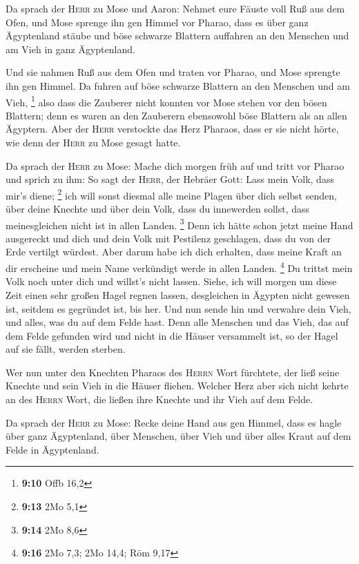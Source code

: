  Da sprach der \textsc{Herr} zu Mose und Aaron: Nehmet
eure Fäuste voll Ruß aus dem Ofen, und Mose sprenge ihn gen Himmel vor
Pharao,  dass es über ganz Ägyptenland stäube und böse
schwarze Blattern auffahren an den Menschen und am Vieh in ganz
Ägyptenland.

 Und sie nahmen Ruß aus dem Ofen und traten vor Pharao,
und Mose sprengte ihn gen Himmel. Da fuhren auf böse schwarze Blattern
an den Menschen und am Vieh, \footnote{\textbf{9:10} Offb 16,2}
 also dass die Zauberer nicht konnten vor Mose stehen vor
den bösen Blattern; denn es waren an den Zauberern ebensowohl böse
Blattern als an allen Ägyptern.  Aber der \textsc{Herr}
verstockte das Herz Pharaos, dass er sie nicht hörte, wie denn der
\textsc{Herr} zu Mose gesagt hatte.

 Da sprach der \textsc{Herr} zu Mose: Mache dich morgen
früh auf und tritt vor Pharao und sprich zu ihm: So sagt der
\textsc{Herr}, der Hebräer Gott: Lass mein Volk, dass mir's diene;
\footnote{\textbf{9:13} 2Mo 5,1}  ich will sonst diesmal
alle meine Plagen über dich selbst senden, über deine Knechte und über
dein Volk, dass du innewerden sollst, dass meinesgleichen nicht ist in
allen Landen. \footnote{\textbf{9:14} 2Mo 8,6}  Denn ich
hätte schon jetzt meine Hand ausgereckt und dich und dein Volk mit
Pestilenz geschlagen, dass du von der Erde vertilgt würdest.
 Aber darum habe ich dich erhalten, dass meine Kraft an
dir erscheine und mein Name verkündigt werde in allen Landen.
\footnote{\textbf{9:16} 2Mo 7,3; 2Mo 14,4; Röm 9,17}  Du
trittst mein Volk noch unter dich und willst's nicht lassen.
 Siehe, ich will morgen um diese Zeit einen sehr großen
Hagel regnen lassen, desgleichen in Ägypten nicht gewesen ist, seitdem
es gegründet ist, bis her.  Und nun sende hin und
verwahre dein Vieh, und alles, was du auf dem Felde hast. Denn alle
Menschen und das Vieh, das auf dem Felde gefunden wird und nicht in die
Häuser versammelt ist, so der Hagel auf sie fällt, werden sterben.

 Wer nun unter den Knechten Pharaos des \textsc{Herrn}
Wort fürchtete, der ließ seine Knechte und sein Vieh in die Häuser
fliehen.  Welcher Herz aber sich nicht kehrte an des
\textsc{Herrn} Wort, die ließen ihre Knechte und ihr Vieh auf dem Felde.

 Da sprach der \textsc{Herr} zu Mose: Recke deine Hand
aus gen Himmel, dass es hagle über ganz Ägyptenland, über Menschen, über
Vieh und über alles Kraut auf dem Felde in Ägyptenland.

